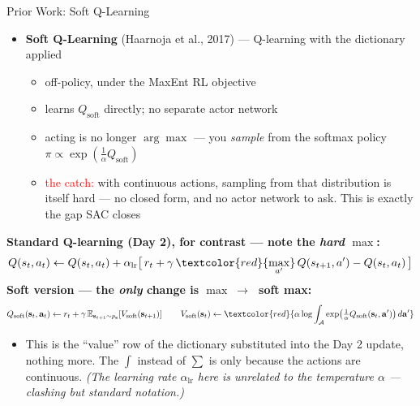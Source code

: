 \begin{frame}{Prior Work: Soft Q-Learning}
\small
\begin{itemize}
    \item \textbf{Soft Q-Learning} (Haarnoja et al., 2017)  --- Q-learning with the dictionary applied
    \begin{itemize}
        \item off-policy, under the MaxEnt RL objective
        \item learns $Q_{\text{soft}}$ directly; no separate actor network
        \item acting is no longer $\arg\max$ --- you \emph{sample} from the softmax policy $\pi \propto \exp(\tfrac1\alpha Q_{\text{soft}})$
        \item \textcolor{red}{the catch:} with continuous actions, sampling from that distribution is itself hard --- no closed form, and no actor network to ask. This is exactly the gap SAC closes
    \end{itemize}
\end{itemize}
\vspace{0.2em}
\textbf{\footnotesize Standard Q-learning (Day 2), for contrast --- note the \emph{hard} $\max$:}
\[
Q(s_t, a_t) \leftarrow Q(s_t, a_t) + \alpha_{\text{lr}}\big[\, r_t + \gamma\, \textcolor{red}{\max_{a'}}\, Q(s_{t+1}, a') - Q(s_t, a_t) \,\big]
\]
\textbf{\footnotesize Soft version --- the \emph{only} change is $\max \;\to\;$ soft max:}
\[
Q_{\text{soft}}(\mathbf{s}_t, \mathbf{a}_t) \leftarrow r_t + \gamma\, \mathbb{E}_{\mathbf{s}_{t+1} \sim p_{\mathbf{s}}}\!\left[ V_{\text{soft}}(\mathbf{s}_{t+1}) \right]
\qquad
V_{\text{soft}}(\mathbf{s}_t) \leftarrow \textcolor{red}{\alpha \log \int_{\mathcal{A}} \exp\!\left( \tfrac{1}{\alpha} Q_{\text{soft}}(\mathbf{s}_t, \mathbf{a}') \right) d\mathbf{a}'}
\]
\vspace{-0.5em}
\begin{itemize}
    \item[] {\footnotesize This is the ``value'' row of the dictionary substituted into the Day 2 update, nothing more. The $\int$ instead of $\sum$ is only because the actions are continuous. \emph{(The learning rate $\alpha_{\text{lr}}$ here is unrelated to the temperature $\alpha$ --- clashing but standard notation.)}}
\end{itemize}
\end{frame}
